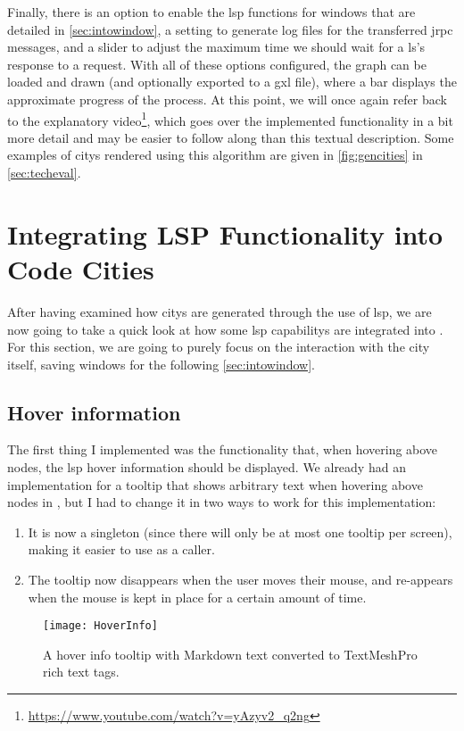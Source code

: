 \documentclass[../thesis]{subfiles}
\begin{document}
Finally, there is an option to enable the \gls{lsp} functions for \glspl{window} that are detailed in \cref{sec:intowindow}, a setting to generate log files for the transferred \gls{jrpc} messages, and a slider to adjust the maximum time we should wait for a \gls{ls}'s response to a request.
With all of these options configured, the graph can be loaded and drawn (and optionally exported to a \gls{gxl} file), where a bar displays the approximate progress of the process.
At this point, we will once again refer back to the explanatory video\footnote{\url{https://www.youtube.com/watch?v=yAzyv2_q2ng}},
which goes over the implemented functionality in a bit more detail and may be easier to follow along than this textual description.
Some examples of \glspl{city} rendered using this algorithm are given in \cref{fig:gencities} in \cref{sec:techeval}.

\section{Integrating LSP Functionality into Code Cities}\label{sec:intocity}
After having examined how \glspl{city} are generated through the use of \gls{lsp}, we are now going to take a quick look at how some \gls{lsp} \glspl{capability} are integrated into \SEE{}.
For this section, we are going to purely focus on the interaction with the city itself, saving \glspl{window} for the following \cref{sec:intowindow}.

\subsection{Hover information}\label{subsec:hover}
The first thing I implemented was the functionality that, when hovering above nodes, the \gls{lsp} hover information should be displayed.
We already had an implementation for a tooltip that shows arbitrary text when hovering above nodes in \SEE{}, but I had to change it in two ways to work for this implementation:
\begin{enumerate}
	\item It is now a \gls{singleton} (since there will only be at most one tooltip per screen), making it easier to use as a caller.
	\item The tooltip now disappears when the user moves their mouse, and re-appears when the mouse is kept in place for a certain amount of time.
\end{enumerate}

\begin{figure}
	\begin{center}
		\texttt{[image: HoverInfo]}
	\end{center}
	\caption{A hover info tooltip with Markdown text converted to TextMeshPro rich text tags.}\label{fig:hoverinfo}
\end{figure}
\end{document}
